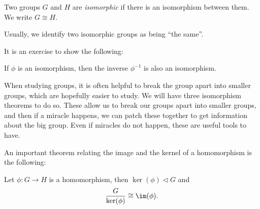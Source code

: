\documentclass[a4paper]{article}
\begin{document}
\begin{defi}
  Two groups $G$ and $H$ are \emph{isomorphic} if there is an isomorphism between them. We write $G \cong H$.
\end{defi}
Usually, we identify two isomorphic groups as being ``the same''.

It is an exercise to show the following:
\begin{lemma}
  If $\phi$ is an isomorphism, then the inverse $\phi^{-1}$ is also an isomorphism.
\end{lemma}

When studying groups, it is often helpful to break the group apart into smaller groups, which are hopefully easier to study. We will have three isomorphism theorems to do so. These allow us to break our groups apart into smaller groups, and then if a miracle happens, we can patch these together to get information about the big group. Even if miracles do not happen, these are useful tools to have.


An important theorem relating the image and the kernel of a homomorphism is the following:
\begin{thm}
  Let $\phi: G \to H$ is a homomorphism, then $\ker(\phi) \lhd G$ and
  \[
    \frac{G}{\ker (\phi)} \cong \im (\phi).
  \]
\end{thm}
\end{document}

